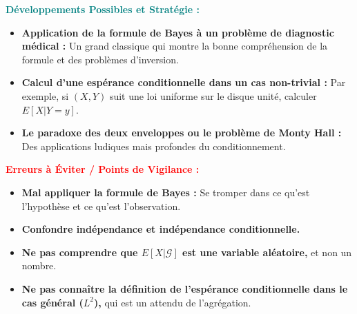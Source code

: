 \documentclass[12pt, a4paper, parskip=full]{report}
\theoremstyle{agregstyle}
\newenvironment{developpements}
  {\par\medskip\noindent\begin{oframed}\noindent\textbf{\textcolor{teal}{Développements Possibles et Stratégie :}}}
  {\end{oframed}\par\medskip}
\newenvironment{erreurs}
  {\par\medskip\noindent\begin{oframed}\noindent\textbf{\textcolor{red}{Erreurs à Éviter / Points de Vigilance :}}}
  {\end{oframed}\par\medskip}
\begin{document}
\begin{developpements}
    \begin{itemize}
        \item \textbf{Application de la formule de Bayes à un problème de diagnostic médical :} Un grand classique qui montre la bonne compréhension de la formule et des problèmes d'inversion.
        \item \textbf{Calcul d'une espérance conditionnelle dans un cas non-trivial :} Par exemple, si $(X,Y)$ suit une loi uniforme sur le disque unité, calculer $E[X|Y=y]$.
        \item \textbf{Le paradoxe des deux enveloppes ou le problème de Monty Hall :} Des applications ludiques mais profondes du conditionnement.
    \end{itemize}
\end{developpements}

\begin{erreurs}
    \begin{itemize}
        \item \textbf{Mal appliquer la formule de Bayes :} Se tromper dans ce qu'est l'hypothèse et ce qu'est l'observation.
        \item \textbf{Confondre indépendance et indépendance conditionnelle.}
        \item \textbf{Ne pas comprendre que $E[X|\mathcal{G}]$ est une variable aléatoire,} et non un nombre.
        \item \textbf{Ne pas connaître la définition de l'espérance conditionnelle dans le cas général ($L^2$),} qui est un attendu de l'agrégation.
    \end{itemize}
\end{erreurs}
\end{document}
